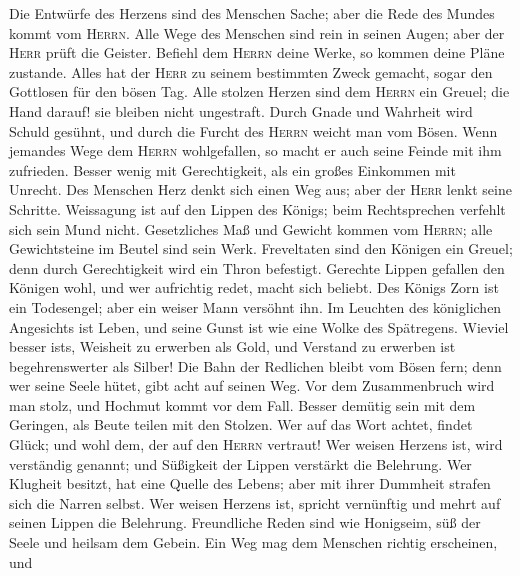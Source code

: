  Die Entwürfe des Herzens sind des Menschen Sache; aber
die Rede des Mundes kommt vom \textsc{Herrn}.  Alle Wege
des Menschen sind rein in seinen Augen; aber der \textsc{Herr} prüft die
Geister.  Befiehl dem \textsc{Herrn} deine Werke, so
kommen deine Pläne zustande.  Alles hat der \textsc{Herr}
zu seinem bestimmten Zweck gemacht, sogar den Gottlosen für den bösen
Tag.  Alle stolzen Herzen sind dem \textsc{Herrn} ein
Greuel; die Hand darauf! sie bleiben nicht ungestraft. 
Durch Gnade und Wahrheit wird Schuld gesühnt, und durch die Furcht des
\textsc{Herrn} weicht man vom Bösen.  Wenn jemandes Wege
dem \textsc{Herrn} wohlgefallen, so macht er auch seine Feinde mit ihm
zufrieden.  Besser wenig mit Gerechtigkeit, als ein großes
Einkommen mit Unrecht.  Des Menschen Herz denkt sich einen
Weg aus; aber der \textsc{Herr} lenkt seine Schritte. 
Weissagung ist auf den Lippen des Königs; beim Rechtsprechen verfehlt
sich sein Mund nicht.  Gesetzliches Maß und Gewicht
kommen vom \textsc{Herrn}; alle Gewichtsteine im Beutel sind sein Werk.
 Freveltaten sind den Königen ein Greuel; denn durch
Gerechtigkeit wird ein Thron befestigt.  Gerechte Lippen
gefallen den Königen wohl, und wer aufrichtig redet, macht sich beliebt.
 Des Königs Zorn ist ein Todesengel; aber ein weiser Mann
versöhnt ihn.  Im Leuchten des königlichen Angesichts ist
Leben, und seine Gunst ist wie eine Wolke des Spätregens.
 Wieviel besser ist\textquotesingle s, Weisheit zu
erwerben als Gold, und Verstand zu erwerben ist begehrenswerter als
Silber!  Die Bahn der Redlichen bleibt vom Bösen fern;
denn wer seine Seele hütet, gibt acht auf seinen Weg. 
Vor dem Zusammenbruch wird man stolz, und Hochmut kommt vor dem Fall.
 Besser demütig sein mit dem Geringen, als Beute teilen
mit den Stolzen.  Wer auf das Wort achtet, findet Glück;
und wohl dem, der auf den \textsc{Herrn} vertraut!  Wer
weisen Herzens ist, wird verständig genannt; und Süßigkeit der Lippen
verstärkt die Belehrung.  Wer Klugheit besitzt, hat eine
Quelle des Lebens; aber mit ihrer Dummheit strafen sich die Narren
selbst.  Wer weisen Herzens ist, spricht vernünftig und
mehrt auf seinen Lippen die Belehrung.  Freundliche Reden
sind wie Honigseim, süß der Seele und heilsam dem Gebein.
 Ein Weg mag dem Menschen richtig erscheinen, und
